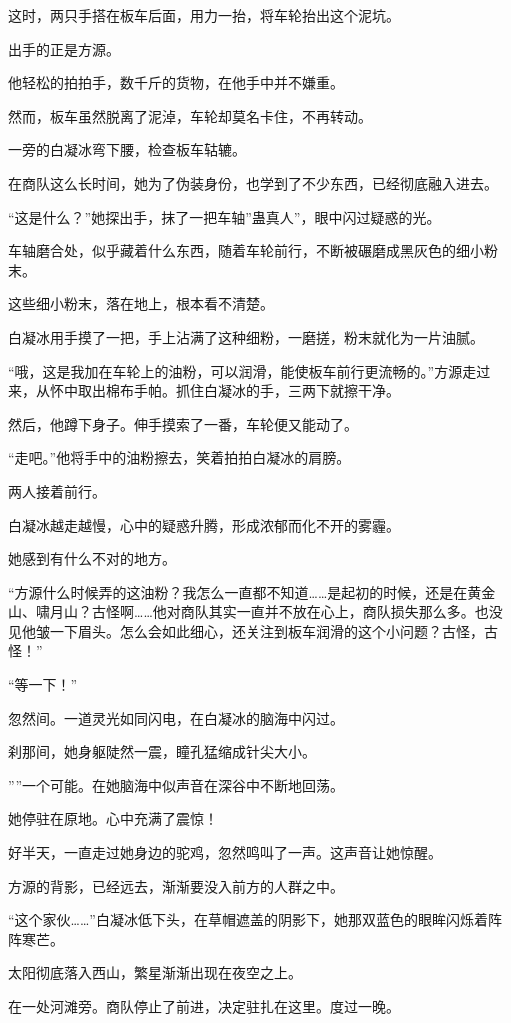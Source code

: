 \begin{this_body}
这时，两只手搭在板车后面，用力一抬，将车轮抬出这个泥坑。

出手的正是方源。

他轻松的拍拍手，数千斤的货物，在他手中并不嫌重。

然而，板车虽然脱离了泥淖，车轮却莫名卡住，不再转动。

一旁的白凝冰弯下腰，检查板车轱辘。

在商队这么长时间，她为了伪装身份，也学到了不少东西，已经彻底融入进去。

“这是什么？”她探出手，抹了一把车轴”蛊真人”，眼中闪过疑惑的光。

车轴磨合处，似乎藏着什么东西，随着车轮前行，不断被碾磨成黑灰色的细小粉末。

这些细小粉末，落在地上，根本看不清楚。

白凝冰用手摸了一把，手上沾满了这种细粉，一磨搓，粉末就化为一片油腻。

“哦，这是我加在车轮上的油粉，可以润滑，能使板车前行更流畅的。”方源走过来，从怀中取出棉布手帕。抓住白凝冰的手，三两下就擦干净。

然后，他蹲下身子。伸手摸索了一番，车轮便又能动了。

“走吧。”他将手中的油粉擦去，笑着拍拍白凝冰的肩膀。

两人接着前行。

白凝冰越走越慢，心中的疑惑升腾，形成浓郁而化不开的雾霾。

她感到有什么不对的地方。

“方源什么时候弄的这油粉？我怎么一直都不知道……是起初的时候，还是在黄金山、啸月山？古怪啊……他对商队其实一直并不放在心上，商队损失那么多。也没见他皱一下眉头。怎么会如此细心，还关注到板车润滑的这个小问题？古怪，古怪！”

“等一下！”

忽然间。一道灵光如同闪电，在白凝冰的脑海中闪过。

刹那间，她身躯陡然一震，瞳孔猛缩成针尖大小。

””一个可能。在她脑海中似声音在深谷中不断地回荡。

她停驻在原地。心中充满了震惊！

好半天，一直走过她身边的驼鸡，忽然鸣叫了一声。这声音让她惊醒。

方源的背影，已经远去，渐渐要没入前方的人群之中。

“这个家伙……”白凝冰低下头，在草帽遮盖的阴影下，她那双蓝色的眼眸闪烁着阵阵寒芒。

太阳彻底落入西山，繁星渐渐出现在夜空之上。

在一处河滩旁。商队停止了前进，决定驻扎在这里。度过一晚。


\end{this_body}
